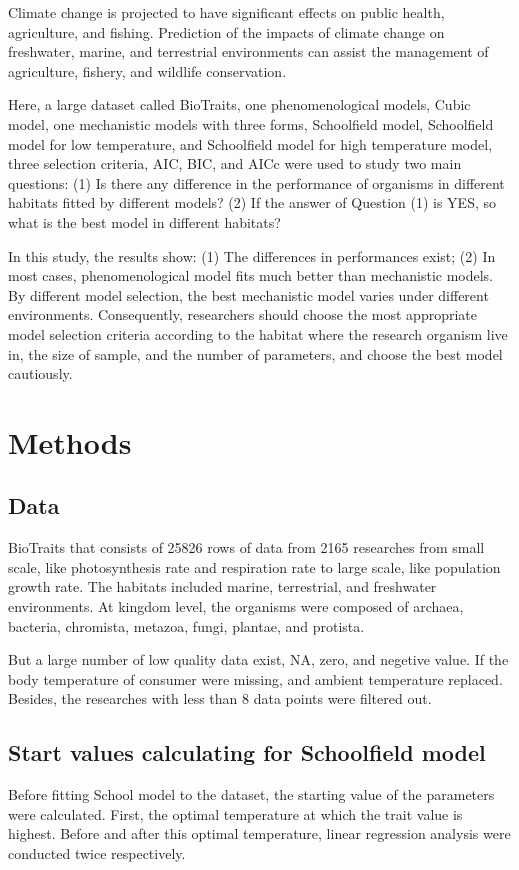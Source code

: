 \documentclass[11pt]{article}
\begin{document}
Climate change is projected to have significant effects on public health\citep{woodward2014climate}, agriculture\citep{howden2007adapting}, and fishing\citep{brander2007global}. Prediction of the impacts of climate change on freshwater, marine, and terrestrial environments can assist the management of agriculture, fishery, and wildlife conservation\citep{prowse2009implications}.

Here, a large dataset called BioTraits\citep{della2013thermal}, one phenomenological models, Cubic model, one mechanistic models with three forms, Schoolfield model, Schoolfield model for low temperature, and Schoolfield model for high temperature model, three selection criteria, AIC, BIC, and AICc were used to study two main questions: (1) Is there any difference in the performance of organisms in different habitats fitted by different models? (2) If the answer of Question (1) is YES, so what is the best model in different habitats?

In this study, the results show: (1) The differences in performances exist; (2) In most cases, phenomenological model fits much better than mechanistic models. By different model selection, the best mechanistic model varies under different environments. Consequently, researchers should choose the most appropriate model selection criteria according to the habitat where the research organism live in, the size of sample, and the number of parameters, and choose the best model cautiously.
		
\section{Methods}
\subsection{Data}
BioTraits\citep{della2013thermal} that consists of 25826 rows of data from 2165 researches from small scale, like photosynthesis rate and respiration rate to large scale, like population growth rate. The habitats included marine, terrestrial, and freshwater environments. At kingdom level, the organisms were composed of archaea, bacteria, chromista, metazoa, fungi, plantae, and protista. 

But a large number of low quality data exist, NA, zero, and negetive value. If the body temperature of consumer were missing, and ambient temperature replaced. Besides, the researches with less than 8 data points were filtered out.

\subsection{Start values calculating for Schoolfield model}
Before fitting School model to the dataset, the starting value of the parameters were calculated. First, the optimal temperature at which the trait value is highest. Before and after this optimal temperature, linear regression analysis were conducted twice respectively. 
\end{document}
